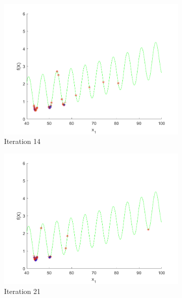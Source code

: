 \begin{figure}
\begin{subfigure}[b]{0.4\textwidth}
   \includegraphics[width=\textwidth]{img/smpl/grwnk1dshft/loa-iter-14}
   \caption{Iteration 14}
   \label{fig:s3-iter-2}
 \end{subfigure}
 \begin{subfigure}[b]{0.4\textwidth}
   \includegraphics[width=\textwidth]{img/smpl/grwnk1dshft/loa-iter-21}
   \caption{Iteration 21}
   \label{fig:s3-iter-3}
 \end{subfigure}
 \begin{subfigure}[b]{0.4\textwidth}

\end{subfigure}
\end{figure}
